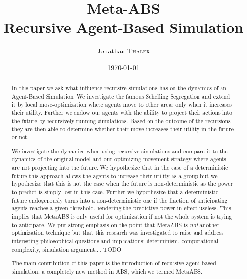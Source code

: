 \documentclass[twocolumn]{article}
\title{Meta-ABS\\Recursive Agent-Based Simulation} %
\author{Jonathan \textsc{Thaler}} %
\date{\today} %
\begin{document}
\maketitle %

\begin{abstract}
In this paper we ask what influence recursive simulations has on the dynamics of an Agent-Based Simulation. We investigate the famous Schelling Segregation and extend it by local move-optimization where agents move to other areas only when it increases their utility. Further we endow our agents with the ability to project their actions into the future by recursively running simulations. Based on the outcome of the recursions they are then able to determine whether their move increases their utility in the future or not.

We investigate the dynamics when using recursive simulations and compare it to the dynamics of the original model and our optimizing movement-strategy where agents are not projecting into the future. We hypothesize that in the case of a deterministic future this approach allows the agents to increase their utility as a group but we hypothesize that this is not the case when the future is non-deterministic as the power to predict is simply lost in this case.  Further we hypothesize that a deterministic future endogenously turns into a non-deterministic one if the fraction of anticipating agents reaches a given threshold, rendering the predictive power in effect useless. This implies that MetaABS is only useful for optimization if not the whole system is trying to anticipate. 
We put strong emphasis on the point that MetaABS is \textit{not} another optimization technique but that this research was investigated to raise and address interesting philosophical questions and implications: determinism, computational complexity, simulation argument,... TODO

The main contribution of this paper is the introduction of recursive agent-based simulation, a completely new method in ABS, which we termed MetaABS.
\end{abstract}













\end{document}
